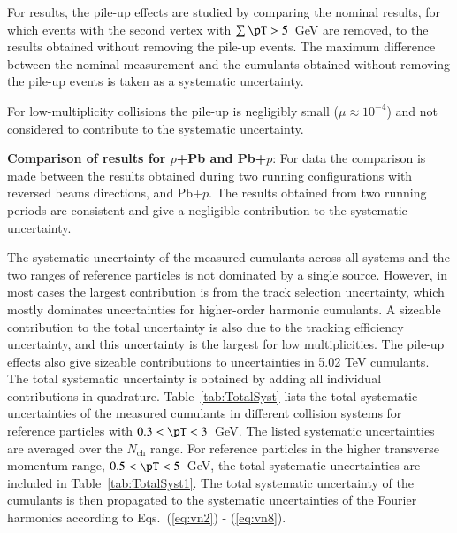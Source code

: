 \documentclass[cernpreprint,texlive=2014,txfonts,UKenglish]{latex/atlasdoc}
\renewcommand{\eqref}[1]{\textup{{\normalfont(\ref{#1}}\normalfont)}}
\begin{document}
For \pPb results, the pile-up effects are studied by comparing the nominal results, for which events with the second vertex with $\sum \pT > 5$~GeV are removed, to the results obtained without removing the pile-up events. The maximum difference between the nominal measurement and the cumulants obtained without removing the pile-up events is taken as a systematic uncertainty.

For low-multiplicity \PbPb collisions the pile-up is negligibly small ($\mu \approx 10^{-4}$) and not considered to contribute to the systematic uncertainty. 

\noindent
\textbf{Comparison of results for $p$+Pb and Pb+$p$}: For \pPb data the comparison is made between the results obtained during two running configurations with reversed beams directions, \pPb  and Pb+$p$.  The results obtained from two running periods are consistent and give a negligible contribution to the systematic uncertainty. 


The systematic uncertainty of the measured cumulants across all systems and the two \pT ranges of reference particles is not dominated by a single source. However, in most
cases the largest contribution is from the track selection uncertainty, which mostly dominates uncertainties for higher-order harmonic cumulants. A sizeable contribution to the total uncertainty is also due to
the tracking efficiency uncertainty, and this uncertainty is the largest for low multiplicities.
The pile-up effects also give sizeable contributions to uncertainties in 5.02 TeV \pp cumulants. The total
systematic uncertainty is obtained by adding all individual contributions in quadrature.
Table~\ref{tab:TotalSyst} lists the total systematic uncertainties of the measured cumulants in different collision systems for reference particles with $0.3 < \pT <3$~GeV. The listed systematic uncertainties are averaged over the $N_{\mathrm{ch}}$ range. For reference particles in the higher transverse momentum range, $0.5 < \pT <5$~GeV, the total systematic uncertainties are included in Table~\ref{tab:TotalSyst1}. The total systematic uncertainty of the cumulants is then propagated to the systematic uncertainties of the Fourier harmonics according to Eqs.~\eqref{eq:vn2} - \eqref{eq:vn8}. 
\end{document}
